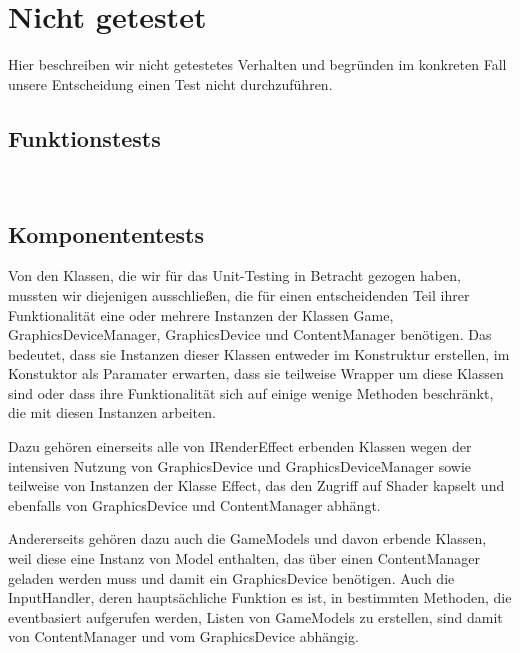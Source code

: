 %



\newpage



\section{Nicht getestet}
\label{Abschnitt:Tests:Protokoll:Nicht_durchgefuehrt}

Hier beschreiben wir nicht getestetes Verhalten und begründen im konkreten Fall unsere Entscheidung einen Test nicht durchzuführen.
~\\




\subsection*{Funktionstests}
\label{Abschnitt:Tests:Nicht:Funktion}

~\\




\subsection*{Komponententests}
\label{Abschnitt:Tests:Nicht:Komponenten}

Von den Klassen, die wir für das Unit-Testing in Betracht gezogen haben, mussten wir diejenigen ausschließen, die für einen entscheidenden Teil ihrer Funktionalität eine oder mehrere Instanzen der Klassen Game, GraphicsDeviceManager, GraphicsDevice und ContentManager benötigen. Das bedeutet, dass sie Instanzen dieser Klassen entweder im Konstruktur erstellen, im Konstuktor als Paramater erwarten, dass sie teilweise Wrapper um diese Klassen sind oder dass ihre Funktionalität sich auf einige wenige Methoden beschränkt, die mit diesen Instanzen arbeiten.

Dazu gehören einerseits alle von IRenderEffect erbenden Klassen wegen der intensiven Nutzung von GraphicsDevice und GraphicsDeviceManager sowie teilweise von Instanzen der Klasse Effect, das den Zugriff auf Shader kapselt und ebenfalls von GraphicsDevice und ContentManager abhängt.

Andererseits gehören dazu auch die GameModels und davon erbende Klassen, weil diese eine Instanz von Model enthalten, das über einen ContentManager geladen werden muss und damit ein GraphicsDevice benötigen. Auch die InputHandler, deren hauptsächliche Funktion es ist, in bestimmten Methoden, die eventbasiert aufgerufen werden, Listen von GameModels zu erstellen, sind damit von ContentManager und vom GraphicsDevice abhängig.
~\\



